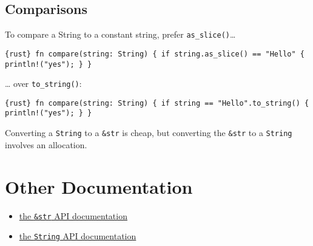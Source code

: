 \documentclass[]{article}
\begin{document}
\subsection{Comparisons}\label{comparisons}

To compare a String to a constant string, prefer
\texttt{as\_slice()}\ldots{}

\texttt{\{rust\} fn compare(string: String) \{     if string.as\_slice() == "Hello" \{         println!("yes");     \} \}}

\ldots{} over \texttt{to\_string()}:

\texttt{\{rust\} fn compare(string: String) \{     if string == "Hello".to\_string() \{         println!("yes");     \} \}}

Converting a \texttt{String} to a \texttt{\&str} is cheap, but
converting the \texttt{\&str} to a \texttt{String} involves an
allocation.

\section{Other Documentation}\label{other-documentation}

\begin{itemize}
\itemsep1pt\parskip0pt
\item
  \href{/std/str/index.html}{the \texttt{\&str} API documentation}
\item
  \href{std/string/index.html}{the \texttt{String} API documentation}
\end{itemize}
\end{document}
